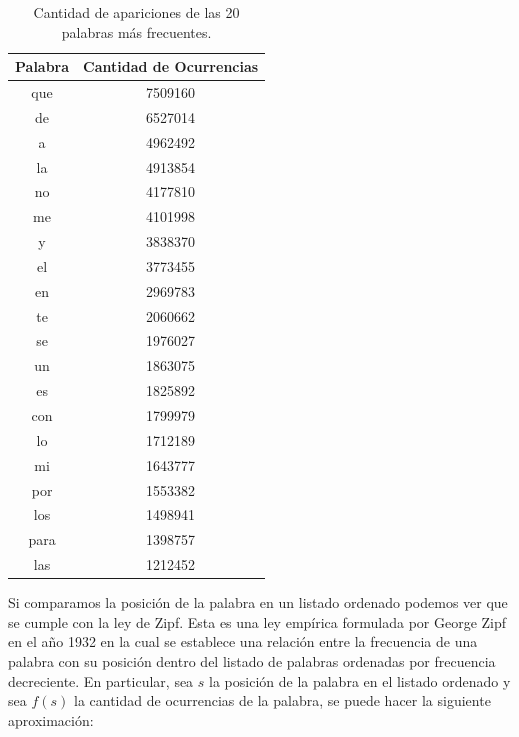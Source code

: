 \begin{table}[ht]
\centering
\label{tab:palabrasMasOcurrentes}
\begin{tabular}{|c|c|}
\hline
Palabra & Cantidad de Ocurrencias \\ \hline
que     & 7509160                 \\
de      & 6527014                 \\
a       & 4962492                 \\
la      & 4913854                 \\
no      & 4177810                 \\
me      & 4101998                 \\
y       & 3838370                 \\
el      & 3773455                 \\
en      & 2969783                 \\
te      & 2060662                 \\
se      & 1976027                 \\
un      & 1863075                 \\
es      & 1825892                 \\
con     & 1799979                 \\
lo      & 1712189                 \\
mi      & 1643777                 \\
por     & 1553382                 \\
los     & 1498941                 \\
para    & 1398757                 \\
las     & 1212452                 \\
\hline
\end{tabular}
\caption{Cantidad de apariciones de las 20 palabras más frecuentes.}

\end{table}

Si comparamos la posición de la palabra en un listado ordenado podemos ver que se cumple con la ley de Zipf. Esta es una ley empírica formulada por George Zipf en el año 1932 en la cual se establece una relación entre la frecuencia de una palabra con su posición dentro del listado de palabras ordenadas por frecuencia decreciente. En particular, sea $s$ la posición de la palabra en el listado ordenado y sea $f(s)$ la cantidad de ocurrencias de la palabra, se puede hacer la siguiente aproximación:

